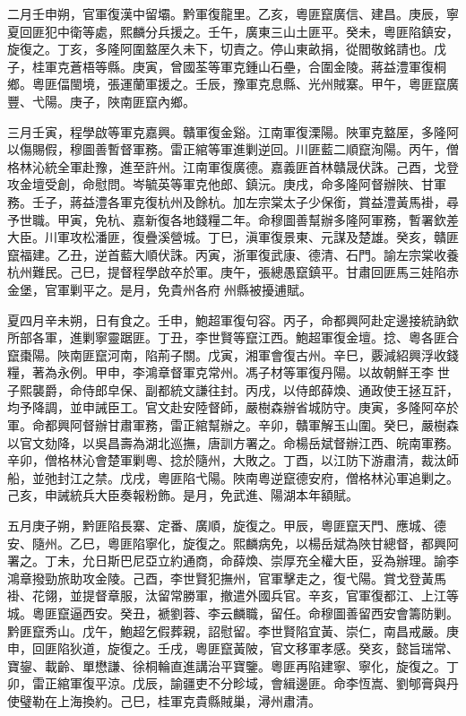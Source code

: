 \begin{pinyinscope}
二月壬申朔，官軍復漢中留壩。黔軍復龍里。乙亥，粵匪竄廣信、建昌。庚辰，寧夏回匪犯中衛等處，熙麟分兵援之。壬午，廣東三山土匪平。癸未，粵匪陷鎮安，旋復之。丁亥，多隆阿圍盩厔久未下，切責之。停山東畝捐，從閻敬銘請也。戊子，桂軍克蒼梧等縣。庚寅，曾國荃等軍克鍾山石壘，合圍金陵。蔣益澧軍復桐鄉。粵匪偪閩境，張運蘭軍援之。壬辰，豫軍克息縣、光州賊寨。甲午，粵匪竄廣豐、弋陽。庚子，陜南匪竄內鄉。

三月壬寅，程學啟等軍克嘉興。贛軍復金谿。江南軍復溧陽。陜軍克盩厔，多隆阿以傷賜假，穆圖善暫督軍務。雷正綰等軍進剿逆回。川匪藍二順竄洵陽。丙午，僧格林沁統全軍赴豫，進至許州。江南軍復廣德。嘉義匪首林贛晟伏誅。己酉，戈登攻金壇受創，命慰問。岑毓英等軍克他郎、鎮沅。庚戌，命多隆阿督辦陜、甘軍務。壬子，蔣益澧各軍克復杭州及餘杭。加左宗棠太子少保銜，賞益澧黃馬褂，尋予世職。甲寅，免杭、嘉新復各地錢糧二年。命穆圖善幫辦多隆阿軍務，暫署欽差大臣。川軍攻松潘匪，復疊溪營城。丁巳，滇軍復景東、元謀及楚雄。癸亥，贛匪竄福建。乙丑，逆首藍大順伏誅。丙寅，浙軍復武康、德清、石門。諭左宗棠收養杭州難民。己巳，提督程學啟卒於軍。庚午，張總愚竄鎮平。甘肅回匪馬三娃陷赤金堡，官軍剿平之。是月，免貴州各府州縣被擾逋賦。

夏四月辛未朔，日有食之。壬申，鮑超軍復句容。丙子，命都興阿赴定邊接統訥欽所部各軍，進剿寧靈踞匪。丁丑，李世賢等竄江西。鮑超軍復金壇。捻、粵各匪合竄棗陽。陜南匪竄河南，陷荊子關。戊寅，湘軍會復古州。辛巳，覈減紹興浮收錢糧，著為永例。甲申，李鴻章督軍克常州。馮子材等軍復丹陽。以故朝鮮王李世子熙襲爵，命侍郎皁保、副都統文謙往封。丙戌，以侍郎薛煥、通政使王拯互訐，均予降調，並申誡臣工。官文赴安陸督師，嚴樹森辦省城防守。庚寅，多隆阿卒於軍。命都興阿督辦甘肅軍務，雷正綰幫辦之。辛卯，贛軍解玉山圍。癸巳，嚴樹森以官文劾降，以吳昌壽為湖北巡撫，唐訓方署之。命楊岳斌督辦江西、皖南軍務。辛卯，僧格林沁會楚軍剿粵、捻於隨州，大敗之。丁酉，以江防下游肅清，裁汰師船，並弛封江之禁。戊戌，粵匪陷弋陽。陜南粵逆竄德安府，僧格林沁軍追剿之。己亥，申誡統兵大臣奏報粉飾。是月，免武進、陽湖本年額賦。

五月庚子朔，黔匪陷長寨、定番、廣順，旋復之。甲辰，粵匪竄天門、應城、德安、隨州。乙巳，粵匪陷寧化，旋復之。熙麟病免，以楊岳斌為陜甘總督，都興阿署之。丁未，允日斯巴尼亞立約通商，命薛煥、崇厚充全權大臣，妥為辦理。諭李鴻章撥勁旅助攻金陵。己酉，李世賢犯撫州，官軍擊走之，復弋陽。賞戈登黃馬褂、花翎，並提督章服，汰留常勝軍，撤遣外國兵官。辛亥，官軍復都江、上江等城。粵匪竄逼西安。癸丑，褫劉蓉、李云麟職，留任。命穆圖善留西安會籌防剿。黔匪竄秀山。戊午，鮑超乞假葬親，詔慰留。李世賢陷宜黃、崇仁，南昌戒嚴。庚申，回匪陷狄道，旋復之。壬戌，粵匪竄黃陂，官文移軍孝感。癸亥，懿旨瑞常、寶鋆、載齡、單懋謙、徐桐輪直進講治平寶鑒。粵匪再陷建寧、寧化，旋復之。丁卯，雷正綰軍復平涼。戊辰，諭疆吏不分畛域，會緝邊匪。命李恆嵩、劉郇膏與丹使璧勒在上海換約。己巳，桂軍克貴縣賊巢，潯州肅清。


\end{pinyinscope}
